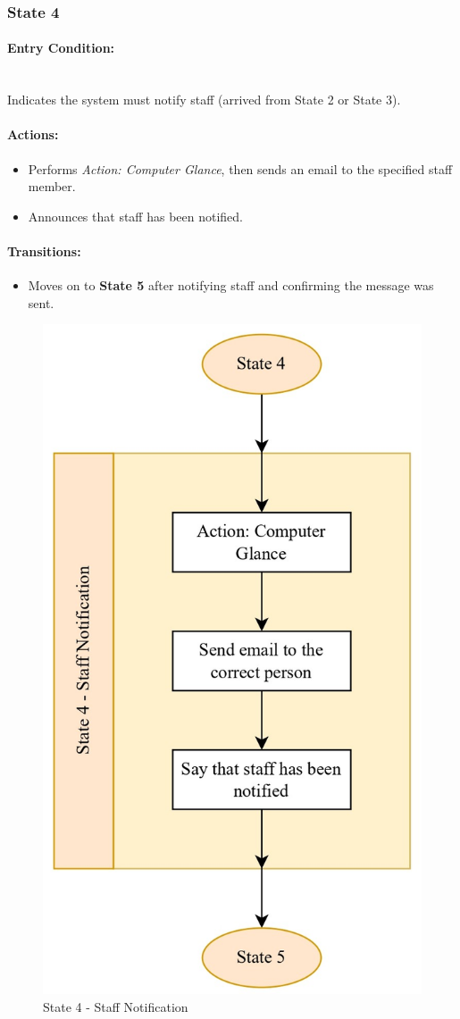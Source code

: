 \documentclass[conference]{IEEEtran}
\begin{document}
\subsubsection{State 4}
\paragraph{Entry Condition:}
\mbox{}\\
Indicates the system must notify staff (arrived from State 2 or State 3).

\paragraph{Actions:}
\begin{itemize}
  \item Performs \emph{Action: Computer Glance}, then sends an email to the specified staff member.
  \item Announces that staff has been notified.
\end{itemize}

\paragraph{Transitions:}
\begin{itemize}
  \item Moves on to \textbf{State 5} after notifying staff and confirming the message was sent.
\end{itemize}

\begin{figure}
    \centering
    \includegraphics[width=.6\linewidth]{State 4 - Staff Notification.jpg}
    \caption{State 4 - Staff Notification}
    \label{State 4 - Staff Notification}
\end{figure}
\end{document}
